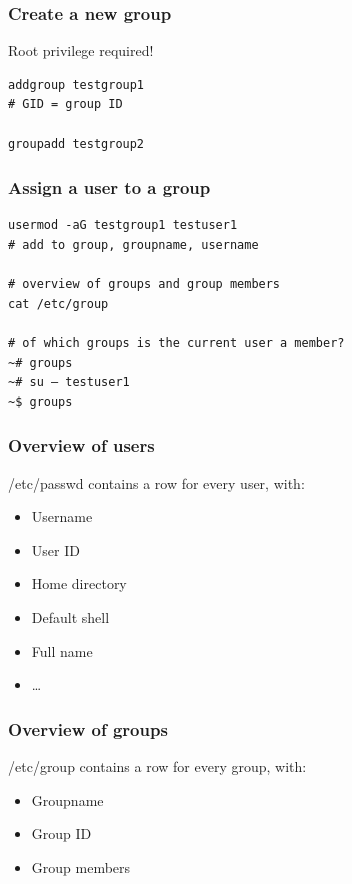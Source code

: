 \documentclass{article}
\begin{document}
\subsubsection{Create a new group}

Root privilege required!

\begin{verbatim}
addgroup testgroup1
# GID = group ID

groupadd testgroup2
\end{verbatim}

\subsubsection{Assign a user to a group}

\begin{verbatim}
usermod -aG testgroup1 testuser1
# add to group, groupname, username

# overview of groups and group members
cat /etc/group

# of which groups is the current user a member?
~# groups
~# su – testuser1
~$ groups
\end{verbatim}

\subsubsection{Overview of users}

/etc/passwd contains a row for every user, with:

\begin{itemize}
    \item Username
    \item User ID
    \item Home directory
    \item Default shell
    \item Full name
    \item \dots
\end{itemize}

\subsubsection{Overview of groups}

/etc/group contains a row for every group, with:

\begin{itemize}
    \item Groupname
    \item Group ID
    \item Group members
\end{itemize}
\end{document}
